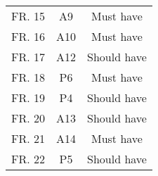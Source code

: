\begin{table}[!htb]
\begin{tabular}{c|c|c}
    \rowcolor[rgb]{0.898,0.898,0.898} FR. 15                  & A9                         & Must have         \\
    FR. 16                                                    & A10                        & Must have         \\
    \rowcolor[rgb]{0.898,0.898,0.898} FR. 17                  & A12                        & Should have       \\
    FR. 18                                                    & P6                         & Must have         \\
    \rowcolor[rgb]{0.898,0.898,0.898} FR. 19                  & P4                         & Should have       \\
    FR. 20                                                    & A13                        & Should have       \\
    \rowcolor[rgb]{0.898,0.898,0.898} FR. 21                  & A14                        & Must have         \\
    FR. 22                                                    & P5                         & Should have       \\
    \bottomrule
  \end{tabular}
\end{table}